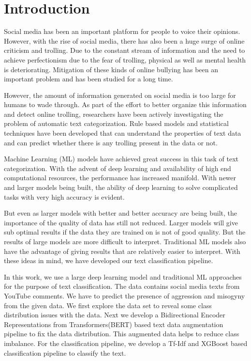 \documentclass[conference]{IEEEtran}
\begin{document}
\section{Introduction}
Social media has been an important platform for people to voice their opinions. 
However, with the rise of social media, there has also been a huge surge of online criticism and trolling. 
Due to the constant stream of information and the need to achieve perfectionism due to the fear of trolling, physical as well as mental health is deteriorating. 
Mitigation of these kinds of online bullying has been an important problem and has been studied for a long time. 

However, the amount of information generated on social media is too large for humans to wade through. As part of the effort to better organize this information and detect online trolling, researchers have been actively investigating the problem of automatic text categorization. Rule based models and statistical techniques have been developed that can understand the properties of text data and can predict whether there is any trolling present in the data or not.

Machine Learning (ML) models have achieved great success in this task of text categorization. With the advent of deep learning and availability of high end computational resources, the performance has increased manifold. With newer and larger models being built, the ability of deep learning to solve complicated tasks with very high accuracy is evident. 

But even as larger models with better and better accuracy are being built, the importance of the quality of data has still not reduced. Larger models will give sub optimal results if the data they are trained on is not of good quality. But the results of large models are more difficult to interpret. Traditional ML models also have the advantage of giving results that are relatively easier to interpret.
With these ideas in mind, we have developed our text classification pipeline.

In this work, we use a large deep learning model and traditional ML approaches for the purpose of text classification. The data contains social media texts from YouTube comments. We have to predict the presence of aggression and misogyny from the given data. We first explore the data set to reveal some class distribution issues with the data. Next we develop a Bidirectional Encoder Representations from Transformers(BERT)\cite{devlin2019bert} based text data augmentation pipeline to fix the data distribution. This augmented data helps to reduce class imbalance. For the classification pipeline, we develop a Tf-Idf and XGBoost based classification pipeline to classify the text. 
\end{document}
